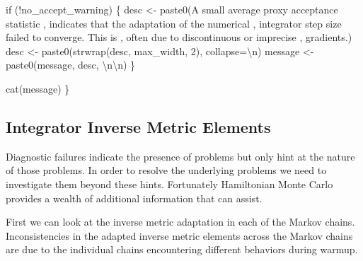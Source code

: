 \documentclass[
  letterpaper,
  DIV=11,
  numbers=noendperiod]{scrartcl}
\newenvironment{Shaded}{\begin{snugshade}}{\end{snugshade}}
\newcommand{\CharTok}[1]{\textcolor[rgb]{0.13,0.47,0.30}{#1}}
\newcommand{\ControlFlowTok}[1]{\textcolor[rgb]{0.00,0.23,0.31}{#1}}
\newcommand{\DecValTok}[1]{\textcolor[rgb]{0.68,0.00,0.00}{#1}}
\newcommand{\NormalTok}[1]{\textcolor[rgb]{0.00,0.23,0.31}{#1}}
\newcommand{\OperatorTok}[1]{\textcolor[rgb]{0.37,0.37,0.37}{#1}}
\newcommand{\StringTok}[1]{\textcolor[rgb]{0.13,0.47,0.30}{#1}}
\begin{document}
\begin{Shaded}
\begin{Highlighting}[]
  \ControlFlowTok{if}\NormalTok{ (}\OperatorTok{!}\NormalTok{no\_accept\_warning) \{}
\NormalTok{    desc }\OperatorTok{\textless{}{-}}\NormalTok{ paste0(}\StringTok{\textquotesingle{}A small average proxy acceptance statistic \textquotesingle{}}\NormalTok{,}
                   \StringTok{\textquotesingle{}indicates that the adaptation of the numerical \textquotesingle{}}\NormalTok{,}
                   \StringTok{\textquotesingle{}integrator step size failed to converge.  This is \textquotesingle{}}\NormalTok{,}
                   \StringTok{\textquotesingle{}often due to discontinuous or imprecise \textquotesingle{}}\NormalTok{,}
                   \StringTok{\textquotesingle{}gradients.\textquotesingle{}}\NormalTok{)}
\NormalTok{    desc }\OperatorTok{\textless{}{-}}\NormalTok{ paste0(strwrap(desc, max\_width, }\DecValTok{2}\NormalTok{), collapse}\OperatorTok{=}\StringTok{\textquotesingle{}}\CharTok{\textbackslash{}n}\StringTok{\textquotesingle{}}\NormalTok{)}
\NormalTok{    message }\OperatorTok{\textless{}{-}}\NormalTok{ paste0(message, desc, }\StringTok{\textquotesingle{}}\CharTok{\textbackslash{}n\textbackslash{}n}\StringTok{\textquotesingle{}}\NormalTok{)}
\NormalTok{  \}}

\NormalTok{  cat(message)}
\NormalTok{\}}
\end{Highlighting}
\end{Shaded}

\subsection{Integrator Inverse Metric
Elements}\label{integrator-inverse-metric-elements}

Diagnostic failures indicate the presence of problems but only hint at
the nature of those problems. In order to resolve the underlying
problems we need to investigate them beyond these hints. Fortunately
Hamiltonian Monte Carlo provides a wealth of additional information that
can assist.

First we can look at the inverse metric adaptation in each of the Markov
chains. Inconsistencies in the adapted inverse metric elements across
the Markov chains are due to the individual chains encountering
different behaviors during warmup.
\end{document}
